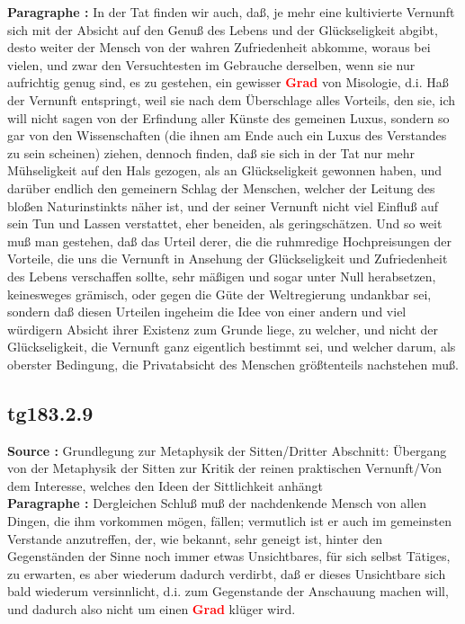 \documentclass[a4paper,12pt,twoside]{book}
\newcommand{\match}[1]{\textcolor{red}{\textbf{#1}}}
\begin{document}
	\noindent\textbf{Paragraphe : }In der Tat finden wir auch, daß, je mehr eine kultivierte Vernunft sich mit der Absicht auf den Genuß des Lebens  und der Glückseligkeit abgibt, desto weiter der Mensch von der wahren Zufriedenheit abkomme, woraus bei vielen, und zwar den Versuchtesten im Gebrauche derselben, wenn sie nur aufrichtig genug sind, es zu gestehen, ein gewisser \match{Grad} von Misologie, d.i. Haß der Vernunft entspringt, weil sie nach dem Überschlage alles Vorteils, den sie, ich will nicht sagen von der Erfindung aller Künste des gemeinen Luxus, sondern so gar von den Wissenschaften (die ihnen am Ende auch ein Luxus des Verstandes zu sein scheinen) ziehen, dennoch finden, daß sie sich in der Tat nur mehr Mühseligkeit auf den Hals gezogen, als an Glückseligkeit gewonnen haben, und darüber endlich den gemeinern Schlag der Menschen, welcher der Leitung des bloßen Naturinstinkts näher ist, und der seiner Vernunft nicht viel Einfluß auf sein Tun und Lassen verstattet, eher beneiden, als geringschätzen. Und so weit muß man gestehen, daß das Urteil derer, die die ruhmredige Hochpreisungen der Vorteile, die uns die Vernunft in Ansehung der Glückseligkeit und Zufriedenheit des Lebens verschaffen sollte, sehr mäßigen und sogar unter Null herabsetzen, keinesweges grämisch, oder gegen die Güte der Weltregierung undankbar sei, sondern daß diesen Urteilen ingeheim die Idee von einer andern und viel würdigern Absicht ihrer Existenz zum Grunde liege, zu welcher, und nicht der Glückseligkeit, die Vernunft ganz eigentlich bestimmt sei, und welcher darum, als oberster Bedingung, die Privatabsicht des Menschen größtenteils nachstehen muß. 
	
	\subsection*{tg183.2.9} 
	\textbf{Source : }Grundlegung zur Metaphysik der Sitten/Dritter Abschnitt: Übergang von der Metaphysik der Sitten zur Kritik der reinen praktischen Vernunft/Von dem Interesse, welches den Ideen der Sittlichkeit anhängt\\  
	
	\noindent\textbf{Paragraphe : }Dergleichen Schluß muß der nachdenkende Mensch von allen Dingen, die ihm vorkommen mögen, fällen; vermutlich ist er auch im gemeinsten Verstande anzutreffen, der, wie bekannt, sehr geneigt ist, hinter den Gegenständen der Sinne noch immer etwas Unsichtbares, für sich selbst Tätiges, zu erwarten, es aber wiederum dadurch verdirbt, daß er dieses Unsichtbare sich bald wiederum versinnlicht, d.i. zum Gegenstande der Anschauung machen will, und dadurch also nicht um einen \match{Grad} klüger wird. 
	
\end{document}
